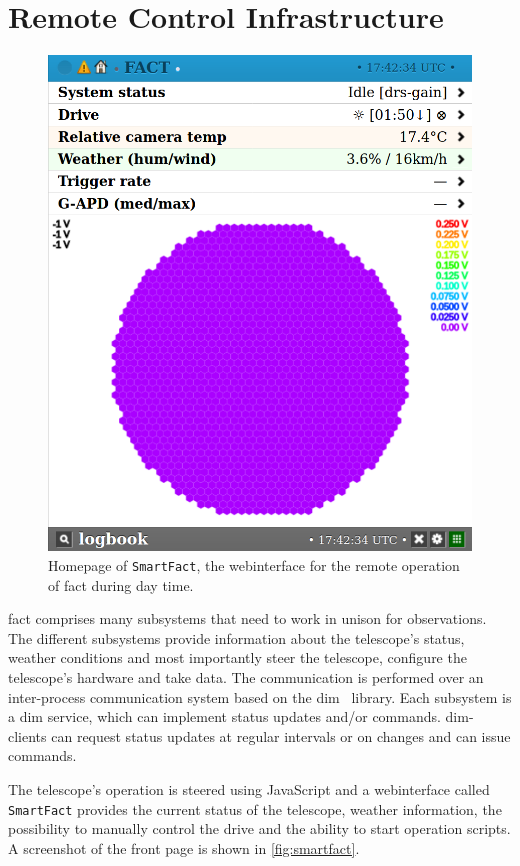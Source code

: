 \section{Remote Control Infrastructure}
\begin{figure}
  \includegraphics[width=\linewidth]{images/smartfact.png} 
  \caption{%
    Homepage of \texttt{SmartFact}, the webinterface for the remote operation of
    \gls{fact} during day time.
  }\label{fig:smartfact}
\end{figure}
\noindent \gls{fact} comprises many subsystems that need to work in unison for
observations.
The different subsystems provide information about the telescope's status,
weather conditions and most importantly steer the telescope, configure the 
telescope's hardware and take data.
The communication is performed over an inter-process communication
system based on the \gls{dim}~\cite{dim} library. 
Each subsystem is a \gls{dim} service, which can implement status updates
and/or commands.
\gls{dim}-clients can request status updates at regular intervals or on changes and can
issue commands.

The telescope's operation is steered using JavaScript and a webinterface
called \texttt{SmartFact} provides the current status of the telescope,
weather information, the possibility to manually control the
drive and the ability to start operation scripts.
A screenshot of the front page is shown in \autoref{fig:smartfact}.

